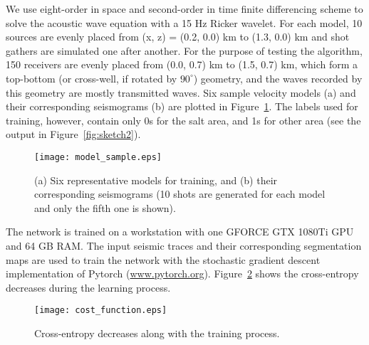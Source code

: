 \documentclass{cph18}
\begin{document}
We use eight-order in space and second-order in time finite differencing scheme to solve the acoustic wave equation with a 15 Hz Ricker wavelet.
For each model, 10 sources are evenly placed from (x, z) = (0.2, 0.0) km to (1.3, 0.0) km and shot gathers are simulated one after another. 
For the purpose of testing the algorithm, 150 receivers are evenly placed from (0.0, 0.7) km to (1.5, 0.7) km, which form a top-bottom (or cross-well, if rotated by $90^\circ$) geometry, and the waves recorded by this geometry are mostly transmitted waves. Six sample velocity models (a) and their corresponding seismograms (b) are plotted in Figure~\ref{fig:model_sample}. The labels used for training, however, contain only 0s for the salt area, and 1s for other area (see the output in Figure~\ref{fig:sketch2}). 
\begin{figure}[!htb]
  \centering
  \texttt{[image: model\_sample.eps]}
  \caption{(a) Six representative models for training, and (b) their corresponding seismograms (10 shots are generated for each model and only the fifth one is shown).}
\label{fig:model_sample}
\end{figure}

The network is trained on a workstation with one GFORCE GTX 1080Ti GPU and 64 GB RAM. The input seismic traces and their corresponding segmentation maps are used to train the network with the stochastic gradient descent implementation of Pytorch (\url{www.pytorch.org}). Figure~\ref{fig:cost_function.eps} shows the cross-entropy decreases during the learning process.

\begin{figure}[!htb]
  \centering
  \texttt{[image: cost\_function.eps]}
  \caption{Cross-entropy decreases along with the training process.}
  \label{fig:cost_function.eps}
\end{figure}
\end{document}
